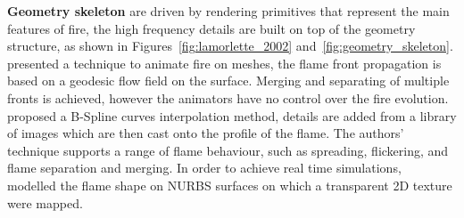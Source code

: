 \textbf{Geometry skeleton} are driven by rendering primitives that represent the main features of fire, the high frequency details are built on top of the geometry structure, as shown in Figures~\ref{fig:lamorlette_2002} and~\ref{fig:geometry_skeleton}.
\cite{Lee:2001} presented a technique to animate fire on meshes, the flame front propagation is based on a geodesic flow field on the surface.
Merging and separating of multiple fronts is achieved, however the animators have no control over the fire evolution. 
\cite{Lamorlette:2002} proposed a B-Spline curves interpolation method, details are added from a library of images which are then cast onto the profile of the flame.
The authors' technique supports a range of flame behaviour, such as spreading, flickering, and flame separation and merging.
In order to achieve real time simulations,~\cite{Bridault:2006} modelled the flame shape on NURBS surfaces on which a transparent 2D texture were mapped.

